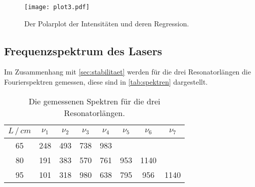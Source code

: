 \begin{figure}
    \centering
    \texttt{[image: plot3.pdf]}
    \caption{Der Polarplot der Intensitäten und deren Regression.}
    \label{fig:plot3}
\end{figure}


\subsection{Frequenzspektrum des Lasers} \label{sec:spektrum}
Im Zusammenhang mit \autoref{sec:stabilitaet} werden für die drei Resonatorlängen die Fourierspektren gemessen,
diese sind in \autoref{tab:spektren} dargestellt.
\begin{table}
    \centering
    \caption{Die gemessenen Spektren für die drei Resonatorlängen.}
    \label{tab:spektren}
    \begin{tabular}{c c c c c c c c}
        \toprule
        $L \, / \, cm$ & $\nu_1$ & $\nu_2$ & $\nu_3$ & $\nu_4$ & $\nu_5$ & $\nu_6$ & $\nu_7$ \\
        \midrule
           65 &  248 &  493 &  738 &  983 &       &        &        \\
           80 &  191 &  383 &  570 &  761 & 953 & 1140 &        \\
           95 &  101 &  318 &  980 &  638 & 795 &  956 & 1140 \\
        \bottomrule
    \end{tabular}
\end{table}


